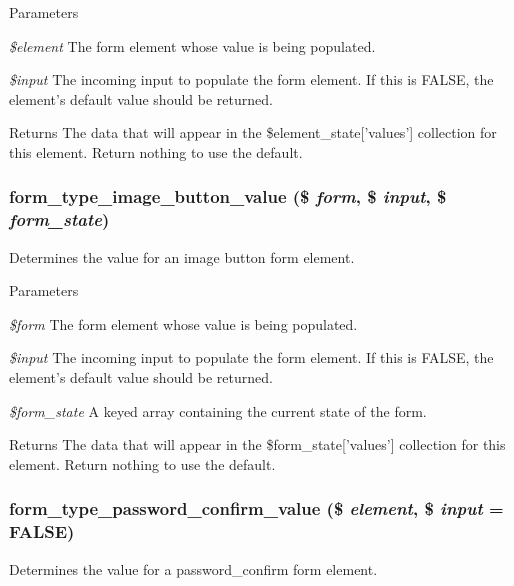 \begin{DoxyParams}{Parameters}
\item[{\em \$element}]The form element whose value is being populated. \item[{\em \$input}]The incoming input to populate the form element. If this is FALSE, the element's default value should be returned.\end{DoxyParams}
\begin{DoxyReturn}{Returns}
The data that will appear in the \$element\_\-state\mbox{[}'values'\mbox{]} collection for this element. Return nothing to use the default. 
\end{DoxyReturn}
\hypertarget{group__form__api_ga504ddd599ddb4a4992638ec6afb7cd40}{
\subsubsection[{form\_\-type\_\-image\_\-button\_\-value}]{\setlength{\rightskip}{0pt plus 5cm}form\_\-type\_\-image\_\-button\_\-value (\$ {\em form}, \/  \$ {\em input}, \/  \$ {\em form\_\-state})}}
\label{group__form__api_ga504ddd599ddb4a4992638ec6afb7cd40}
Determines the value for an image button form element.


\begin{DoxyParams}{Parameters}
\item[{\em \$form}]The form element whose value is being populated. \item[{\em \$input}]The incoming input to populate the form element. If this is FALSE, the element's default value should be returned. \item[{\em \$form\_\-state}]A keyed array containing the current state of the form.\end{DoxyParams}
\begin{DoxyReturn}{Returns}
The data that will appear in the \$form\_\-state\mbox{[}'values'\mbox{]} collection for this element. Return nothing to use the default. 
\end{DoxyReturn}
\hypertarget{group__form__api_ga3e473dba683cd32c95de1193f2a8fb94}{
\subsubsection[{form\_\-type\_\-password\_\-confirm\_\-value}]{\setlength{\rightskip}{0pt plus 5cm}form\_\-type\_\-password\_\-confirm\_\-value (\$ {\em element}, \/  \$ {\em input} = {\ttfamily FALSE})}}
\label{group__form__api_ga3e473dba683cd32c95de1193f2a8fb94}
Determines the value for a password\_\-confirm form element.


